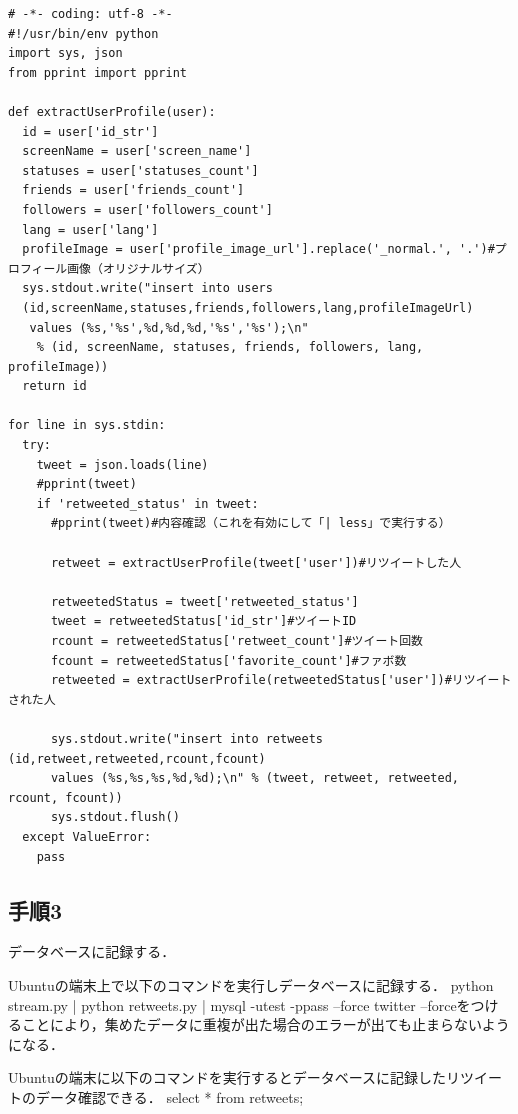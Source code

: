 \begin{verbatim}
# -*- coding: utf-8 -*-
#!/usr/bin/env python
import sys, json
from pprint import pprint

def extractUserProfile(user):
  id = user['id_str']
  screenName = user['screen_name']
  statuses = user['statuses_count']
  friends = user['friends_count']
  followers = user['followers_count']
  lang = user['lang']
  profileImage = user['profile_image_url'].replace('_normal.', '.')#プロフィール画像（オリジナルサイズ）
  sys.stdout.write("insert into users 
  (id,screenName,statuses,friends,followers,lang,profileImageUrl)
   values (%s,'%s',%d,%d,%d,'%s','%s');\n"
    % (id, screenName, statuses, friends, followers, lang, profileImage))
  return id

for line in sys.stdin:
  try:
    tweet = json.loads(line)
    #pprint(tweet)
    if 'retweeted_status' in tweet:
      #pprint(tweet)#内容確認（これを有効にして「| less」で実行する）
      
      retweet = extractUserProfile(tweet['user'])#リツイートした人
      
      retweetedStatus = tweet['retweeted_status']
      tweet = retweetedStatus['id_str']#ツイートID
      rcount = retweetedStatus['retweet_count']#ツイート回数
      fcount = retweetedStatus['favorite_count']#ファボ数
      retweeted = extractUserProfile(retweetedStatus['user'])#リツイートされた人

      sys.stdout.write("insert into retweets (id,retweet,retweeted,rcount,fcount) 
      values (%s,%s,%s,%d,%d);\n" % (tweet, retweet, retweeted, rcount, fcount))
      sys.stdout.flush()
  except ValueError:
    pass
\end{verbatim}

\subsection{手順3}
データベースに記録する．

Ubuntuの端末上で以下のコマンドを実行しデータベースに記録する．
python stream.py | python retweets.py | mysql -utest -ppass --force twitter
--forceをつけることにより，集めたデータに重複が出た場合のエラーが出ても止まらないようになる．

\clearpage

Ubuntuの端末に以下のコマンドを実行するとデータベースに記録したリツイートのデータ確認できる．
select * from retweets;

